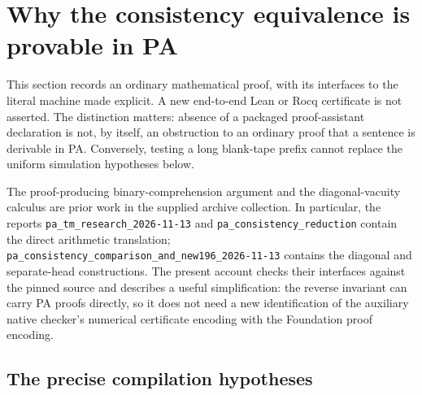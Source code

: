 \section{Why the consistency equivalence is provable in PA}
\label{sec:pa-bridge-audit}

This section records an ordinary mathematical proof, with its interfaces to
the literal machine made explicit.  A new end-to-end Lean or Rocq certificate
is not asserted.  The distinction matters: absence of a packaged proof-assistant
declaration is not, by itself, an obstruction to an ordinary proof that a
sentence is derivable in PA.  Conversely, testing a long blank-tape prefix
cannot replace the uniform simulation hypotheses below.

The proof-producing binary-comprehension argument and the diagonal-vacuity
calculus are prior work in the supplied archive collection.  In particular,
the reports \texttt{pa\_tm\_research\_2026-11-13} and
\texttt{pa\_consistency\_reduction} contain the direct arithmetic translation;
\nolinkurl{pa_consistency_comparison_and_new196_2026-11-13} contains the
diagonal and separate-head constructions.  The present account checks their
interfaces against the pinned source and describes a useful simplification:
the reverse invariant can carry PA proofs directly, so it does not need a
new identification of the auxiliary native checker's numerical certificate
encoding with the Foundation proof encoding.

\subsection{The precise compilation hypotheses}

